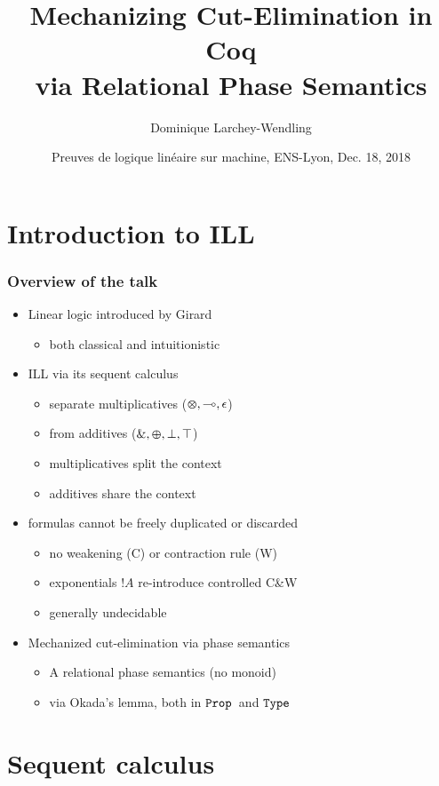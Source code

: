 \documentclass[xcolor=pdftex,graphicx=pdftex,12pt]{beamer}
\title{Mechanizing Cut-Elimination in Coq\\ via Relational Phase Semantics}
\author{Dominique Larchey-Wendling}
\institute{Université de Lorraine, LORIA, CNRS, Nancy, France}
\date{Preuves de logique linéaire sur machine, ENS-Lyon, Dec. 18, 2018}
\newcommand{\coq}[1]{\ensuremath{\mathalpha{\mathtt{#1}}}}
\newcommand{\Prop}{\coq{Prop}}
\newcommand{\Type}{\coq{Type}}
\newcommand{\lwith}{\mathbin{\text{\upshape \&}}}
\newcommand{\lplus}{\mathbin{\varoplus}}
\newcommand{\ltime}{\mathbin{\varotimes}}
\newcommand{\lunit}{\mathalpha{\epsilon}}
\newcommand{\limp}{\mathbin{\multimap}}
\newcommand{\ltop}{\mathalpha{\top}}
\newcommand{\lbot}{\mathalpha{\bot}}
\newcommand{\lbang}{\mathop{!}}
\begin{document}
\begin{frame}\titlepage\end{frame}

\section{Introduction to ILL}

\begin{frame}

\frametitle{Overview of the talk}

\begin{itemize}
\item Linear logic introduced by Girard
  \begin{itemize}
  \item both classical and intuitionistic
  \end{itemize}
\item ILL via its sequent calculus
  \begin{itemize}
  \item separate multiplicatives (${\ltime},{\limp},{\lunit}$)
  \item from additives (${\lwith},{\lplus},\lbot, \ltop$)
  \item multiplicatives split the context
  \item additives share the context
  \end{itemize}
\item formulas cannot be freely duplicated or discarded
  \begin{itemize}
  \item no weakening (C) or contraction rule (W)
  \item exponentials $\lbang A$ re-introduce controlled C\&W
  \item generally undecidable
  \end{itemize}
\item Mechanized cut-elimination via phase semantics
  \begin{itemize}
  \item A relational phase semantics (no monoid)
  \item via Okada's lemma, both in \Prop\ and \Type
  \end{itemize}
\end{itemize}

\end{frame}

\section{Sequent calculus}
\end{document}
